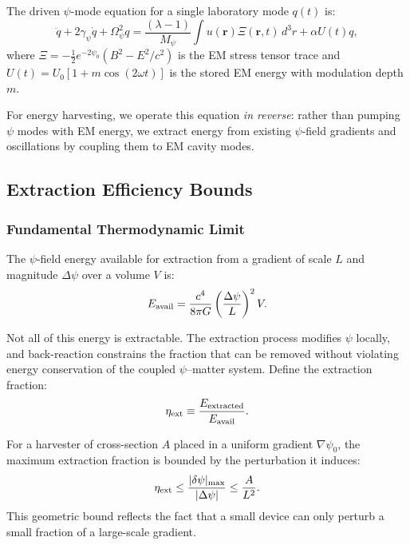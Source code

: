 \documentclass[aps,prd,twocolumn,showpacs,preprintnumbers,superscriptaddress,nofootinbib]{revtex4-2}
\begin{document}
The driven $\psi$-mode equation for a single laboratory mode $q(t)$ is:
\begin{equation}\label{eq:mode-eq}
\ddot{q} + 2\gamma_\psi\dot{q} + \Omega_\psi^2 q = \frac{(\lambda-1)}{M_\psi}\int u(\mathbf{r})\Xi(\mathbf{r},t)\,d^3r + \alpha U(t)q,
\end{equation}
where $\Xi = -\frac{1}{2}e^{-2\psi_0}(B^2 - E^2/c^2)$ is the EM stress
tensor trace and $U(t) = U_0[1+m\cos(2\omega t)]$ is the stored EM energy
with modulation depth $m$.

For energy harvesting, we operate this equation \emph{in reverse}: rather
than pumping $\psi$ modes with EM energy, we extract energy from existing
$\psi$-field gradients and oscillations by coupling them to EM cavity modes.

\subsection{Extraction Efficiency Bounds}\label{sec:efficiency}

\subsubsection{Fundamental Thermodynamic Limit}

The $\psi$-field energy available for extraction from a gradient of scale
$L$ and magnitude $\Delta\psi$ over a volume $V$ is:
\begin{equation}\label{eq:available-energy}
E_{\rm avail} = \frac{c^4}{8\pi G}\left(\frac{\Delta\psi}{L}\right)^2 V.
\end{equation}

Not all of this energy is extractable.  The extraction process modifies
$\psi$ locally, and back-reaction constrains the fraction that can be
removed without violating energy conservation of the coupled
$\psi$--matter system.  Define the extraction fraction:
\begin{equation}
\eta_{\rm ext} \equiv \frac{E_{\rm extracted}}{E_{\rm avail}}.
\end{equation}

For a harvester of cross-section $A$ placed in a uniform gradient
$\nabla\psi_0$, the maximum extraction fraction is bounded by the
perturbation it induces:
\begin{equation}\label{eq:eta-bound}
\eta_{\rm ext} \leq \frac{|\delta\psi|_{\rm max}}{|\Delta\psi|} \leq \frac{A}{L^2}.
\end{equation}
This geometric bound reflects the fact that a small device can only
perturb a small fraction of a large-scale gradient.
\end{document}
